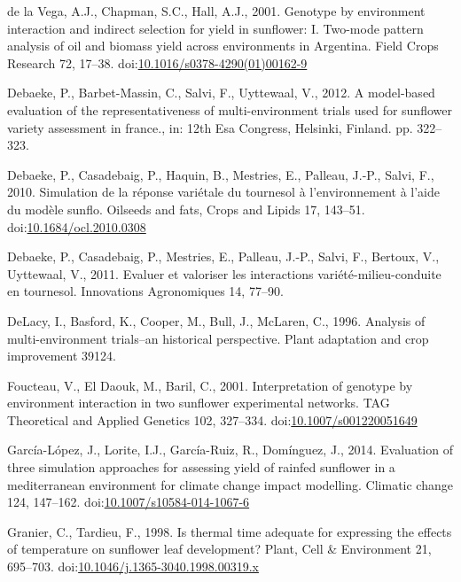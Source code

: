 \documentclass[a4paper]{article}
\begin{document}
\hypertarget{ref-Vega2001a}{}
de la Vega, A.J., Chapman, S.C., Hall, A.J., 2001. Genotype by
environment interaction and indirect selection for yield in sunflower:
I. Two-mode pattern analysis of oil and biomass yield across
environments in Argentina. Field Crops Research 72, 17--38.
doi:\href{https://doi.org/10.1016/s0378-4290(01)00162-9}{10.1016/s0378-4290(01)00162-9}

\hypertarget{ref-Debaeke2012b}{}
Debaeke, P., Barbet-Massin, C., Salvi, F., Uyttewaal, V., 2012. A
model-based evaluation of the representativeness of multi-environment
trials used for sunflower variety assessment in france., in: 12th Esa
Congress, Helsinki, Finland. pp. 322--323.

\hypertarget{ref-Debaeke2010}{}
Debaeke, P., Casadebaig, P., Haquin, B., Mestries, E., Palleau, J.-P.,
Salvi, F., 2010. Simulation de la réponse variétale du tournesol à
l'environnement à l'aide du modèle sunflo. Oilseeds and fats, Crops and
Lipids 17, 143--51.
doi:\href{https://doi.org/10.1684/ocl.2010.0308}{10.1684/ocl.2010.0308}

\hypertarget{ref-Debaeke2011a}{}
Debaeke, P., Casadebaig, P., Mestries, E., Palleau, J.-P., Salvi, F.,
Bertoux, V., Uyttewaal, V., 2011. Evaluer et valoriser les interactions
variété-milieu-conduite en tournesol. Innovations Agronomiques 14,
77--90.

\hypertarget{ref-DeLacy1996}{}
DeLacy, I., Basford, K., Cooper, M., Bull, J., McLaren, C., 1996.
Analysis of multi-environment trials--an historical perspective. Plant
adaptation and crop improvement 39124.

\hypertarget{ref-Foucteau2001}{}
Foucteau, V., El Daouk, M., Baril, C., 2001. Interpretation of genotype
by environment interaction in two sunflower experimental networks. TAG
Theoretical and Applied Genetics 102, 327--334.
doi:\href{https://doi.org/10.1007/s001220051649}{10.1007/s001220051649}

\hypertarget{ref-GarciaLopez2014}{}
García-López, J., Lorite, I.J., García-Ruiz, R., Domínguez, J., 2014.
Evaluation of three simulation approaches for assessing yield of rainfed
sunflower in a mediterranean environment for climate change impact
modelling. Climatic change 124, 147--162.
doi:\href{https://doi.org/10.1007/s10584-014-1067-6}{10.1007/s10584-014-1067-6}

\hypertarget{ref-Granier1998}{}
Granier, C., Tardieu, F., 1998. Is thermal time adequate for expressing
the effects of temperature on sunflower leaf development? Plant, Cell \&
Environment 21, 695--703.
doi:\href{https://doi.org/10.1046/j.1365-3040.1998.00319.x}{10.1046/j.1365-3040.1998.00319.x}
\end{document}
